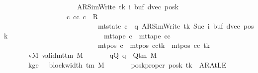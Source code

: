 \begin{isabellebody}
\ \ \ \ \ \ \ \ \ \ \ \ \ \ \ \ \ \ \ \ \ {\isacharparenleft}{\kern0pt}AR{\isacharunderscore}{\kern0pt}SimWrite{\isacharcomma}{\kern0pt}\ tk{\isacharcomma}{\kern0pt}\ i{\isacharcomma}{\kern0pt}\ buf{\isacharcomma}{\kern0pt}\ dvec{\isacharcomma}{\kern0pt}\ posk{\isacharparenright}{\kern0pt}\ {\isasymrbrakk}\isanewline
\ \ \ \ \ \ \ \ \ \ \ \ \ \ \ \ \ {\isasymLongrightarrow}\ {\isasymexists}c{\isacharprime}{\kern0pt}{\isacharprime}{\kern0pt}{\isachardot}{\kern0pt}\ {\isacharparenleft}{\kern0pt}cc{\isacharcomma}{\kern0pt}\ c{\isacharprime}{\kern0pt}{\isacharprime}{\kern0pt}{\isacharparenright}{\kern0pt}\ {\isasymin}\ R{\isacharprime}{\kern0pt}\isanewline
\ \ \ \ \ \ \ \ \ \ \ \ \ \ \ \ \ \ \ \ \ \ \ \ \ \ {\isasymand}\ mt{\isacharunderscore}{\kern0pt}state\ c{\isacharprime}{\kern0pt}{\isacharprime}{\kern0pt}\ {\isacharequal}{\kern0pt}\ {\isacharparenleft}{\kern0pt}q{\isacharcomma}{\kern0pt}\ AR{\isacharunderscore}{\kern0pt}SimWrite{\isacharcomma}{\kern0pt}\ tk{\isacharcomma}{\kern0pt}\ Suc\ i{\isacharcomma}{\kern0pt}\ buf{\isacharcomma}{\kern0pt}\ dvec{\isacharcomma}{\kern0pt}\ posk{\isacharparenright}{\kern0pt}\isanewline
\ \ \ \ \ \ \ \ \ \ \ \ \ \ \ \ \ \ \ \ \ \ \ \ \ \ {\isasymand}\ mt{\isacharunderscore}{\kern0pt}tape\ c{\isacharprime}{\kern0pt}{\isacharprime}{\kern0pt}\ {\isacharequal}{\kern0pt}\ mt{\isacharunderscore}{\kern0pt}tape\ cc\isanewline
\ \ \ \ \ \ \ \ \ \ \ \ \ \ \ \ \ \ \ \ \ \ \ \ \ \ {\isasymand}\ mt{\isacharunderscore}{\kern0pt}pos\ c{\isacharprime}{\kern0pt}{\isacharprime}{\kern0pt}\ {\isacharequal}{\kern0pt}\ {\isacharparenleft}{\kern0pt}mt{\isacharunderscore}{\kern0pt}pos\ cc{\isacharparenright}{\kern0pt}{\isacharparenleft}{\kern0pt}tk\ {\isacharcolon}{\kern0pt}{\isacharequal}{\kern0pt}\ mt{\isacharunderscore}{\kern0pt}pos\ cc\ tk\ {\isacharminus}{\kern0pt}\ {}{\isacharparenright}{\kern0pt}{\isachardoublequoteclose}\isanewline
\ \ \ \ \ \ \ vM{\isacharcolon}{\kern0pt}\ {\isachardoublequoteopen}valid{\isacharunderscore}{\kern0pt}mttm\ M{\isachardoublequoteclose}\isanewline
\ \ \ \ \ \ \ qQ{\isacharcolon}{\kern0pt}\ {\isachardoublequoteopen}q\ {\isasymin}\ Q{\isacharunderscore}{\kern0pt}tm\ M{\isachardoublequoteclose}\isanewline
\ \ \ \ \ \ \ kge{}{\isacharcolon}{\kern0pt}\ {\isachardoublequoteopen}{}\ {\isasymle}\ block{\isacharunderscore}{\kern0pt}width\ {\isacharparenleft}{\kern0pt}{\isasymGamma}{\isacharunderscore}{\kern0pt}tm\ M{\isacharparenright}{\kern0pt}{\isachardoublequoteclose}\isanewline
\ \ \ \ \ \ \ poskproper{\isacharcolon}{\kern0pt}\ {\isachardoublequoteopen}posk\ tk\ {\isasymnoteq}\ AR{\isacharunderscore}{\kern0pt}AtLE{\isachardoublequoteclose}\isanewline

\end{isabellebody}
